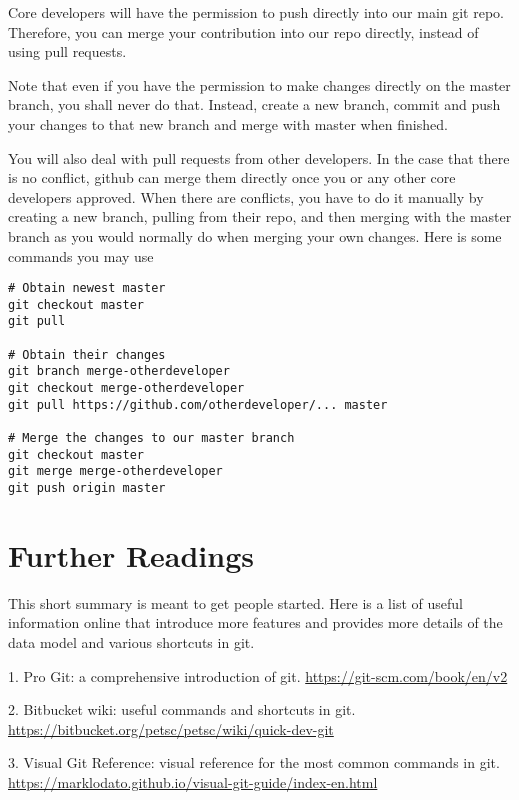 \documentclass[runningheads,letterpaper]{llncs}
\begin{document}
Core developers will have the permission to push directly into our main git repo.
Therefore, you can merge your contribution into our repo directly, instead of using pull requests.

Note that even if you have the permission to make changes directly on the master branch, you shall never do that.
Instead, create a new branch, commit and push your changes to that new branch and merge with master when finished.

You will also deal with pull requests from other developers.
In the case that there is no conflict, github can merge them directly once you or any other core developers approved.
When there are conflicts, you have to do it manually by creating a new branch, pulling from their repo, and then merging with the master branch as you would normally do when merging your own changes.
Here is some commands you may use
\begin{verbatim}
# Obtain newest master
git checkout master
git pull

# Obtain their changes
git branch merge-otherdeveloper
git checkout merge-otherdeveloper
git pull https://github.com/otherdeveloper/... master

# Merge the changes to our master branch
git checkout master
git merge merge-otherdeveloper
git push origin master
\end{verbatim}

\section{Further Readings}

This short summary is meant to get people started.
Here is a list of useful information online that introduce more features and provides more details of the data model and various shortcuts in git.

1. Pro Git: a comprehensive introduction of git. \url{https://git-scm.com/book/en/v2}

2. Bitbucket wiki: useful commands and shortcuts in git. \url{https://bitbucket.org/petsc/petsc/wiki/quick-dev-git}

3. Visual Git Reference: visual reference for the most common commands in git. \url{https://marklodato.github.io/visual-git-guide/index-en.html}
\end{document}
